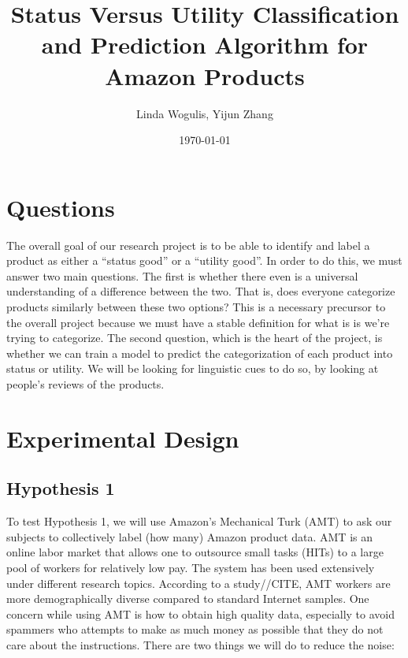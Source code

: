 \documentclass[dvips,12pt]{article}
\begin{document}

\title{\textbf{Status Versus Utility Classification and Prediction Algorithm for Amazon Products}}
\author{Linda Wogulis, Yijun Zhang}
\date{\today}



\maketitle


\section{Questions}


The overall goal of our research project is to be able to identify and label a product as either a “status good” or a “utility good”. In order to do this, we must answer two main questions. The first is whether there even is a universal understanding of a difference between the two. That is, does everyone categorize products similarly between these two options? This is a necessary precursor to the overall project because we must have a stable definition for what is is we’re trying to categorize. The second question, which is the heart of the project, is whether we can train a model to predict the categorization of each product into status or utility. We will be looking for linguistic cues to do so, by looking at people’s reviews of the products. 



\section{Experimental Design}

\subsection{Hypothesis 1}
To test Hypothesis 1, we will use Amazon’s Mechanical Turk (AMT) to ask our subjects to collectively label (how many) Amazon product data. AMT is an online labor market that allows one to outsource small tasks (HITs) to a large pool of workers for relatively low pay. The system has been used extensively under different research topics. According to a study//CITE, AMT workers are more demographically diverse compared to standard Internet samples.
One concern while using AMT is how to obtain high quality data, especially to avoid spammers who attempts to make as much money as possible that they do not care about the instructions. There are two things we will do to reduce the noise:
	
\end{document}
